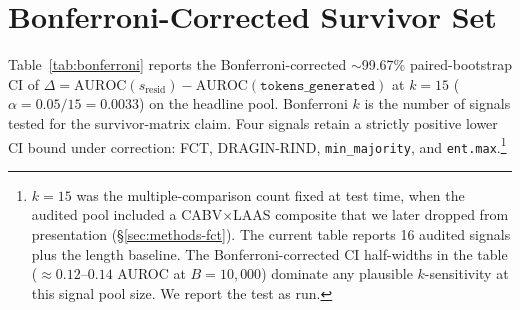 \documentclass[11pt]{article}
\begin{document}
\appendix

\section{Bonferroni-Corrected Survivor Set}
\label{sec:appendix-bonferroni}

Table~\ref{tab:bonferroni} reports the Bonferroni-corrected $\sim$99.67\% paired-bootstrap CI of $\Delta = \mathrm{AUROC}(s_{\text{resid}}) - \mathrm{AUROC}(\texttt{tokens\_generated})$ at $k{=}15$ ($\alpha = 0.05/15 = 0.0033$) on the headline pool. Bonferroni $k$ is the number of signals tested for the survivor-matrix claim. Four signals retain a strictly positive lower CI bound under correction: FCT, DRAGIN-RIND, \texttt{min\_majority}, and \texttt{ent.max}.\footnote{$k{=}15$ was the multiple-comparison count fixed at test time, when the audited pool included a CABV$\times$LAAS composite that we later dropped from presentation (\S\ref{sec:methods-fct}). The current table reports 16 audited signals plus the length baseline. The Bonferroni-corrected CI half-widths in the table ($\approx 0.12$--$0.14$ AUROC at $B{=}10{,}000$) dominate any plausible $k$-sensitivity at this signal pool size. We report the test as run.}
\end{document}
